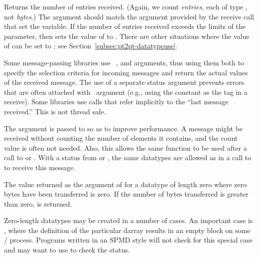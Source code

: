 Returns the number of entries received.  (Again, we count \emph{entries}, each of
type , not \emph{bytes}.)
The  argument should match
the argument provided by the receive call that set the  variable.
If the number of entries received exceeds the limits of the 
parameter, then  sets the value of  to
.
There are other situations where the value of
 can be set to ; see Section~\ref{subsec:pt2pt-datatypeuse}.

\begin{rationale}
Some message-passing libraries use \INOUT\ ,
 and  arguments, thus using them both to specify
the selection criteria for incoming messages and return the actual 
values of the received message.
The use of a separate status argument prevents errors that are often attached
with \INOUT\ argument (e.g., using the
 constant as
the tag in a receive).
Some libraries use calls that refer implicitly to the ``last message
received.''  This is not thread safe.

The  argument is passed to  so as to
improve performance. A message might be received without counting the number
of elements it contains, and the count value is often not needed.
Also, this allows the same function to be used after a call to
 or . With a status from  or ,
the same datatypes are allowed as in a call to  to receive this message.
\end{rationale}

The value returned as the  argument of
 for a datatype of length zero where zero bytes
have been transferred is zero.  If the number of bytes transferred is
greater than zero,  is returned.

\begin{rationale}
Zero-length datatypes may be created in a number of cases.
An important case is
, where the
definition of the particular
darray
results in an empty block on some
\MPI/ process.  Programs written in an SPMD style will not check for
this special case and may want to use  to check
the status.
\end{rationale}

